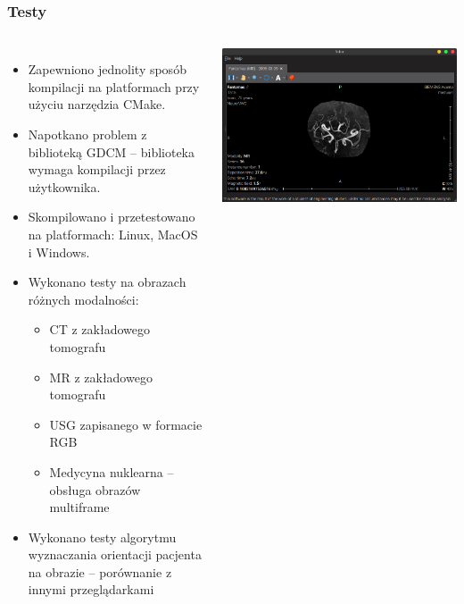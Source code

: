 \documentclass[aspectratio=169]{beamer}
\begin{document}
\begin{frame}[t]
    \frametitle{Testy}

    \vspace{-3mm}
    \begin{columns}[T]
        \footnotesize
        \begin{itemize}
            \item Zapewniono jednolity sposób kompilacji na platformach przy użyciu narzędzia CMake.
            \item Napotkano problem z biblioteką GDCM -- biblioteka wymaga kompilacji przez użytkownika.
            \item Skompilowano i przetestowano na platformach: Linux, MacOS i Windows.
            \item Wykonano testy na obrazach różnych modalności:
                  \begin{itemize}
                      \item CT z zakładowego tomografu
                      \item MR z zakładowego tomografu
                      \item USG zapisanego w formacie RGB
                      \item Medycyna nuklearna -- obsługa obrazów multiframe
                  \end{itemize}
            \item Wykonano testy algorytmu wyznaczania orientacji pacjenta na obrazie -- porównanie z innymi przeglądarkami
        \end{itemize}
        \includegraphics[width=\textwidth]{img/test001.png}

\end{columns}
\end{frame}
\end{document}
